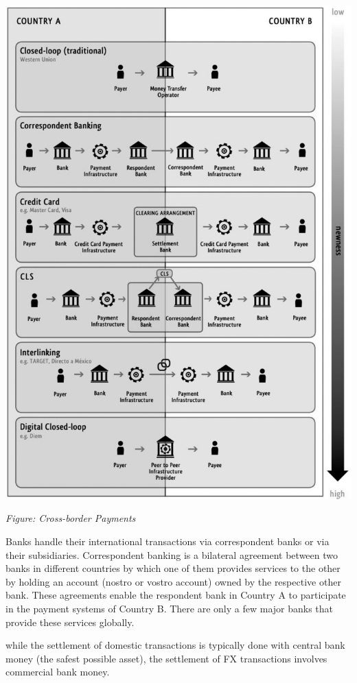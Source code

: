 \documentclass[
]{book}
\begin{document}
\includegraphics{fig/global_payment_processes.jpeg}

\emph{Figure: Cross-border Payments}

Banks handle their international transactions via correspondent banks or via their subsidiaries. Correspondent banking is a bilateral agreement between two banks in different countries by which one of them provides services to the other by holding an account (nostro or vostro account) owned by the respective other bank.
These agreements enable the respondent bank in Country A to participate in the payment systems of Country B. There are only a few major banks that provide these services globally.

while the settlement of domestic transactions is typically done with central bank money (the safest possible asset), the settlement of FX transactions involves commercial bank money.
\end{document}
